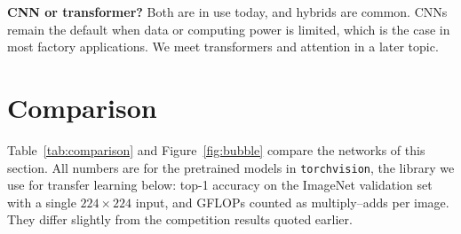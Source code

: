 \documentclass[12pt, a4paper]{article}
\begin{document}
\begin{notebox}
  \textbf{CNN or transformer?} Both are in use today, and hybrids are common.
  CNNs remain the default when data or computing power is limited, which is
  the case in most factory applications. We meet transformers and attention
  in a later topic.
\end{notebox}

\section{Comparison}
\label{sec:comparison}

Table~\ref{tab:comparison} and Figure~\ref{fig:bubble} compare the networks of
this section. All numbers are for the pretrained models in
\texttt{torchvision}, the library we use for transfer learning below:
top-1 accuracy on the ImageNet validation set with a single
$224 \times 224$ input, and GFLOPs counted as multiply--adds per image. They
differ slightly from the competition results quoted earlier.
\end{document}

